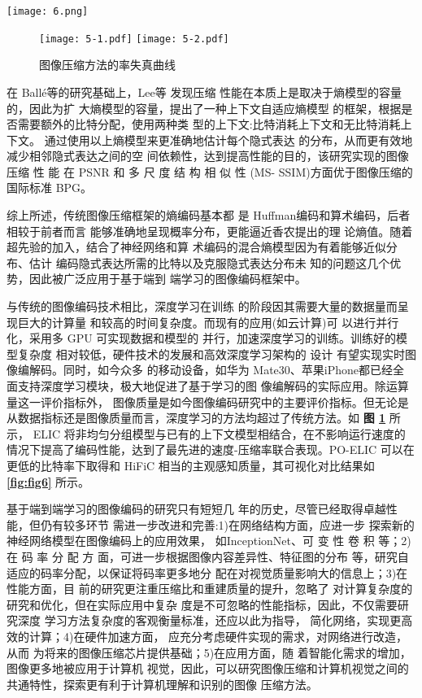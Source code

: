 \begin{figure*}[!ht]
	\centering
	\texttt{[image: 6.png]}
	\caption{低比特率下 PO-ELIC 和 HiFiC 的可视化结果}
	\label{fig:fig6}
\end{figure*}

\begin{figure}[!ht]
	\centering
	\texttt{[image: 5-1.pdf]}
	\texttt{[image: 5-2.pdf]}
	\caption{图像压缩方法的率失真曲线}
	\label{fig:fig5}
\end{figure}


在 Ballé等的研究基础上，Lee等 \cite{lee2018context}发现压缩 性能在本质上是取决于熵模型的容量的，因此为扩 大熵模型的容量，提出了一种上下文自适应熵模型 的框架，根据是否需要额外的比特分配，使用两种类 型的上下文:比特消耗上下文和无比特消耗上下文。 通过使用以上熵模型来更准确地估计每个隐式表达 的分布，从而更有效地减少相邻隐式表达之间的空 间依赖性，达到提高性能的目的，该研究实现的图像 压缩 性 能 在 PSNR 和 多 尺 度 结 构 相 似 性 (MS- SSIM)方面优于图像压缩的国际标准 BPG。

 综上所述，传统图像压缩框架的熵编码基本都 是 Huffman编码和算术编码，后者相较于前者而言 能够准确地呈现概率分布，更能逼近香农提出的理 论熵值。随着超先验的加入，结合了神经网络和算 术编码的混合熵模型因为有着能够近似分布、估计 编码隐式表达所需的比特以及克服隐式表达分布未 知的问题这几个优势，因此被广泛应用于基于端到 端学习的图像编码框架中。

与传统的图像编码技术相比，深度学习在训练 的阶段因其需要大量的数据量而呈现巨大的计算量 和较高的时间复杂度。而现有的应用(如云计算)可 以进行并行化，采用多 GPU 可实现数据和模型的 并行，加速深度学习的训练。训练好的模型复杂度 相对较低，硬件技术的发展和高效深度学习架构的 设计 \cite{chen2019eyeriss}有望实现实时图像编解码。同时，如今众多 的移动设备，如华为 Mate30、苹果iPhone都已经全 面支持深度学习模块，极大地促进了基于学习的图 像编解码的实际应用。除运算量这一评价指标外， 图像质量是如今图像编码研究中的主要评价指标。但无论是从数据指标还是图像质量而言，深度学习的方法均超过了传统方法。如 \textbf{图 \ref{fig:fig5}} 所示， ELIC \cite{he2022elic} 将非均匀分组模型与已有的上下文模型相结合，在不影响运行速度的情况下提高了编码性能，达到了最先进的速度-压缩率联合表现。PO-ELIC \cite{he2022po} 可以在更低的比特率下取得和 HiFiC \cite{mentzer2020high} 相当的主观感知质量，其可视化对比结果如 \textbf{\ref{fig:fig6}} 所示。

基于端到端学习的图像编码的研究只有短短几 年的历史，尽管已经取得卓越性能，但仍有较多环节 需进一步改进和完善:1)在网络结构方面，应进一步 探索新的神经网络模型在图像编码上的应用效果， 如InceptionNet、可 变 性 卷 积 等；2)在 码 率 分 配 方 面，可进一步根据图像内容差异性、特征图的分布 等，研究自适应的码率分配，以保证将码率更多地分 配在对视觉质量影响大的信息上；3)在性能方面，目 前的研究更注重压缩比和重建质量的提升，忽略了 对计算复杂度的研究和优化，但在实际应用中复杂 度是不可忽略的性能指标，因此，不仅需要研究深度 学习方法复杂度的客观衡量标准，还应以此为指导， 简化网络，实现更高效的计算；4)在硬件加速方面， 应充分考虑硬件实现的需求，对网络进行改造，从而 为将来的图像压缩芯片提供基础；5)在应用方面，随 着智能化需求的增加，图像更多地被应用于计算机 视觉，因此，可以研究图像压缩和计算机视觉之间的 共通特性，探索更有利于计算机理解和识别的图像 压缩方法。

